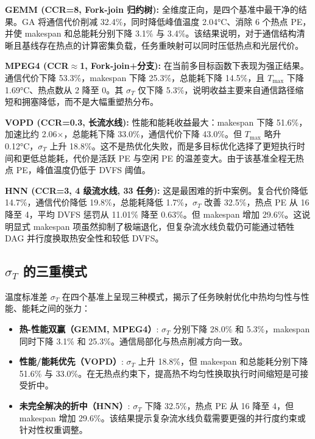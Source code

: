 \documentclass[conference]{IEEEtran}
\begin{document}
\textbf{GEMM (CCR=8, Fork-join 归约树):} 全维度正向，是四个基准中最干净的结果。GA 将通信代价削减 32.4\%，同时降低峰值温度 2.04\si{\degreeCelsius}、消除 6 个热点 PE，并使 makespan 和总能耗分别下降 3.1\% 与 3.4\%。该结果说明，对于通信结构清晰且基线存在热点的计算密集负载，任务重映射可以同时压低热点和光层代价。

\textbf{MPEG4 (CCR$\approx$1, Fork-join+分支):} 在当前多目标函数下表现为强正结果。通信代价下降 53.3\%，makespan 下降 25.3\%，总能耗下降 14.5\%，且 $T_{\max}$ 下降 1.69\si{\degreeCelsius}、热点数从 2 降至 0。其 $\sigma_T$ 仅下降 5.3\%，说明收益主要来自通信路径缩短和拥塞降低，而不是大幅重塑热分布。

\textbf{VOPD (CCR=0.3, 长流水线):} 性能和能耗收益最大：makespan 下降 51.6\%，加速比约 2.06$\times$，总能耗下降 33.0\%，通信代价下降 43.0\%。但 $T_{\max}$ 略升 0.12\si{\degreeCelsius}，$\sigma_T$ 上升 18.8\%。这不是热优化失败，而是多目标优化选择了更短执行时间和更低总能耗，代价是活跃 PE 与空闲 PE 的温差变大。由于该基准全程无热点 PE，峰值温度仍低于 DVFS 阈值。

\textbf{HNN (CCR=3, 4 级流水线, 33 任务):} 这是最困难的折中案例。复合代价降低 14.7\%，通信代价降低 19.8\%，总能耗降低 1.7\%，$\sigma_T$ 改善 32.5\%，热点 PE 从 16 降至 4，平均 DVFS 惩罚从 11.01\% 降至 0.63\%。但 makespan 增加 29.6\%。这说明显式 makespan 项虽然抑制了极端退化，但复杂流水线负载仍可能通过牺牲 DAG 并行度换取热安全性和较低 DVFS。

\subsection{$\sigma_T$ 的三重模式}

温度标准差 $\sigma_T$ 在四个基准上呈现三种模式，揭示了任务映射优化中热均匀性与性能、能耗之间的张力：

\begin{itemize}
\item \textbf{热-性能双赢（GEMM, MPEG4）}: $\sigma_T$ 分别下降 28.0\% 和 5.3\%，makespan 同时下降 3.1\% 和 25.3\%。通信局部化与热点削减方向一致。
\item \textbf{性能/能耗优先（VOPD）}: $\sigma_T$ 上升 18.8\%，但 makespan 和总能耗分别下降 51.6\% 与 33.0\%。在无热点约束下，提高热不均匀性换取执行时间缩短是可接受折中。
\item \textbf{未完全解决的折中（HNN）}: $\sigma_T$ 下降 32.5\%，热点 PE 从 16 降至 4，但 makespan 增加 29.6\%。该结果提示复杂流水线负载需要更强的并行度约束或针对性权重调整。
\end{itemize}
\end{document}
